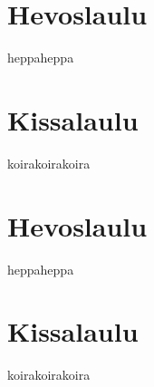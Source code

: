 
\chapter{Hevoslaulu}
heppaheppa
\chapter{Kissalaulu}
koirakoirakoira
\chapter{Hevoslaulu}
heppaheppa
\chapter{Kissalaulu}
koirakoirakoira